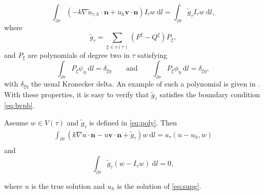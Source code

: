 \documentclass[times]{nlaauth}
\numberwithin{equation}{section}
\begin{document}
\begin{equation} \label{eq:bvpbsum}
\int_{\partial \tau} ( - k \nabla \widetilde u_{\tau, h} \cdot \boldsymbol{n} + u_h \boldsymbol{v} \cdot \boldsymbol{n} ) I_\tau w \ \text{d} l  = \int_{\partial \tau} \widetilde g_\tau  I_\tau w \ \text{d} l,
\end{equation}
where
\begin{equation} \label{eq:poly}
\widetilde g_\tau = \sum_{\xi \in v(\tau)} ( F^\xi - Q^\xi ) P_\xi,
\end{equation}
and $P_\xi$ are polynomials of degree two in $\tau$ satisfying
\begin{equation*}
\int_{\partial\tau} P_\xi \psi_\eta \ \text{d} l = \delta_{\xi \eta}  \qquad \text{and}  \qquad \int_{\partial\tau} P_\xi \phi_\eta \ \text{d} l = \delta_{\xi \eta},
\end{equation*}
with $ \delta_{\xi \eta}$ the usual Kronecker delta. 
An example of such a polynomial is given in \cite{bush2013application}.
With these properties, it is easy to verify that $\widetilde{g}_\tau$ satisfies the boundary condition \eqref{eq:bvpb}.

\begin{lem} \label{lem:link}
Assume $w\in V(\tau)$ and $\widetilde g_\tau $ is defined in \eqref{eq:poly}. Then
\begin{equation} \label{eq:pass1}
\begin{aligned}
\int_{\partial \tau} ( k \nabla u \cdot \boldsymbol{n} - u \boldsymbol{v} \cdot \boldsymbol{n} + \widetilde g_\tau) w \ \text{d} l  = a_\tau(u - u_h, w) \\
\end{aligned}
\end{equation}
and
\begin{equation} \label{eq:pass2}
\int_{\partial \tau} \widetilde g_\tau( w - I_\tau w)  \ \text{d} l = 0,
\end{equation}
\end{lem}
\noindent
where $u$ is the true solution and $u_h$ is the solution of \eqref{eq:supg}.
\end{document}

